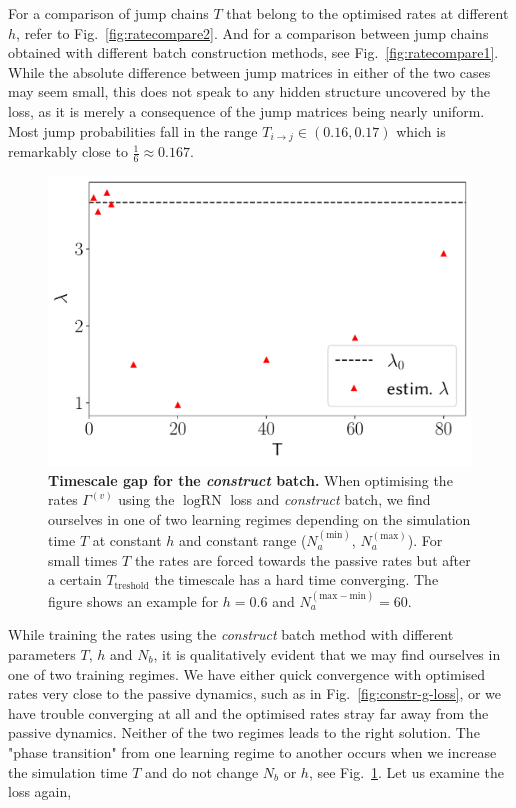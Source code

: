 For a comparison of jump chains $T$ that belong to the optimised rates at different $h$, refer to Fig.~\ref{fig:ratecompare2}. And for a comparison between jump chains obtained with different batch construction methods, see Fig.~\ref{fig:ratecompare1}. While the absolute difference between jump matrices in either of the two cases may seem small, this does not speak to any hidden structure uncovered by the loss, as it is merely a consequence of the jump matrices being nearly uniform. Most jump probabilities fall in the range $T_{i \rightarrow j} \in (0.16, 0.17)$ which is remarkably close to $\frac{1}{6} \approx 0.167$.
\begin{figure}[H]
	\centering
	\includegraphics[width=0.65\linewidth]{Chapter5/Figs/Vector/Tvlamb}
	\caption[Timescale gap for the \emph{construct} batch.]{\textbf{Timescale gap for the \emph{construct} batch.} When optimising the rates $\Gamma^{(v)}$ using the $\log \text{RN}$ loss and \emph{construct} batch, we find ourselves in one of two learning regimes depending on the simulation time $T$ at constant $h$ and constant range ($N_a^{(\text{min})}$, $N_a^{(\text{max})}$). For small times $T$ the rates are forced towards the passive rates but after a certain $T_\text{treshold}$ the timescale has a hard time converging. The figure shows an example for $h=0.6$ and $N_a^{(\text{max}-\text{min})} = 60$.}
	\label{fig:tvlamb}
\end{figure}
While training the rates using the \emph{construct} batch method with different parameters $T$, $h$ and $N_b$, it is qualitatively evident that we may find ourselves in one of two training regimes. We have either quick convergence with optimised rates very close to the passive dynamics, such as in Fig.~\ref{fig:constr-g-loss}, or we have trouble converging at all and the optimised rates stray far away from the passive dynamics. Neither of the two regimes leads to the right solution. The "phase transition" from one learning regime to another occurs when we increase the simulation time $T$ and do not change $N_b$ or $h$, see Fig.~\ref{fig:tvlamb}. Let us examine the loss again,

